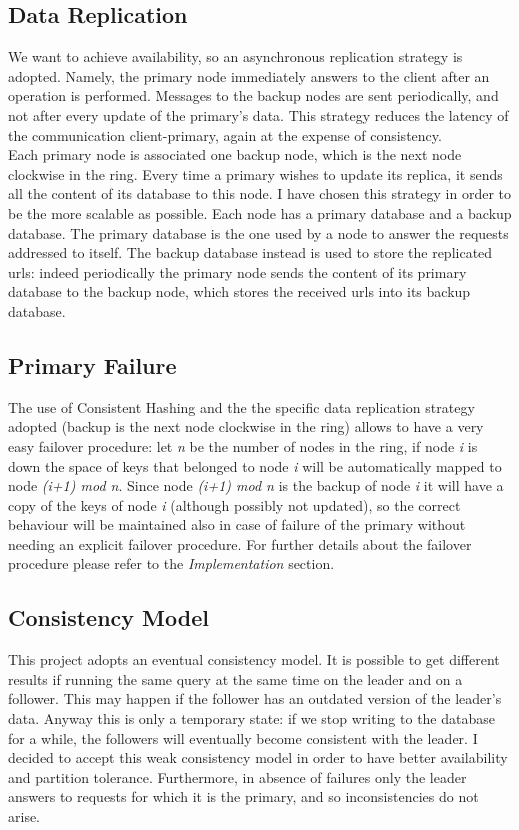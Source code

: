 \documentclass{article}
\begin{document}
\subsection{Data Replication}
We want to achieve availability, so an asynchronous replication strategy is adopted. Namely, the primary node immediately answers to the client after an operation is performed. Messages to the backup nodes are sent periodically, and not after every update of the primary's data. This strategy reduces the latency of the communication client-primary, again at the expense of consistency. \\
Each primary node is associated one backup node, which is the next node clockwise in the ring. Every time a primary wishes to update its replica, it sends all the content of its database to this node. I have chosen this strategy in order to be the more scalable as possible. Each node has a primary database and a backup database. The primary database is the one used by a node to answer the requests addressed to itself. The backup database instead is used to store the replicated urls: indeed periodically the primary node sends the content of its primary database to the backup node, which stores the received urls into its backup database.

\subsection{Primary Failure}
The use of Consistent Hashing and the the specific data replication strategy adopted (backup is the next node clockwise in the ring) allows to have a very easy failover procedure: let \textit{n} be the number of nodes in the ring, if node \textit{i} is down the space of keys that belonged to node \textit{i} will be automatically mapped to node \textit{(i+1) mod n}. Since node \textit{(i+1) mod n} is the backup of node \textit{i} it will have a copy of the keys of node \textit{i} (although possibly not updated), so the correct behaviour will be maintained also in case of failure of the primary without needing an explicit failover procedure. For further details about the failover procedure please refer to the  \textit{Implementation} section.    


\subsection{Consistency Model}
This project adopts an eventual consistency model. It is possible to get different results if running the same query at the same time on the leader and on a follower. This may happen if the follower has an outdated version of the leader's data. Anyway this is only a temporary state: if we stop writing to the database for a while, the followers will eventually become consistent with the leader. I decided to accept this weak consistency model in order to have better availability and partition tolerance. Furthermore, in absence of failures only the leader answers to requests for which it is the primary, and so inconsistencies do not arise.
\end{document}
